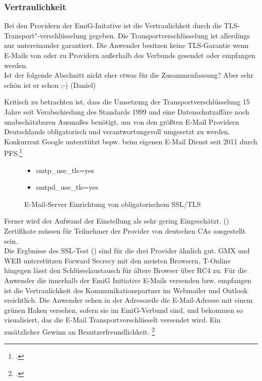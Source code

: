 \documentclass  [paper=a4,
				fontsize=12pt,
				listof=totoc,
				bibliography=totoc
				]{scrreprt}
\begin{document}
		\subsubsection{Vertraulichkeit}		
			Bei den Providern der EmiG-Initative ist die Vertraulichkeit durch die TLS-Transport"-verschlüsselung gegeben. 
			Die Transportverschlüsselung ist allerdings nur untereinander garantiert. 
			Die Anwender besitzen keine TLS-Garantie wenn E-Mails von oder zu Providern außerhalb des Verbunds gesendet oder empfangen werden.\\

			\color{darkred}
				Ist der folgende Abschnitt nicht eher etwas für die Zusammenfassung?
				Aber sehr schön ist er schon ;-) (Daniel)
			\color{black}

			Kritisch zu betrachten ist, dass die Umsetzung der Transportverschlüsselung 15 Jahre seit Verabschiedung des Standards 1999 und eine Datenschutzaffäre noch unabschätzbaren Ausmaßes benötigt, um von den größten E-Mail Providern Deutschlands obligatorisch und verantwortungsvoll umgesetzt zu werden. 
			Konkurrent Google unterstützt bspw. beim eigenen E-Mail Dienst seit 2011 durch PFS.\footcite[Vgl.][]{Boeck2013}
			
			\begin{figure} %
				\vspace{-24pt}
				\centering
				\begin{itemize}
					\renewcommand{\labelitemi}{$\Rightarrow$}
					\item smtp\_use\_tls=yes
					\item smtpd\_use\_tls=yes
				\end{itemize}
				\caption[EmiG: SSL/TLS wurde aktiviert]{E-Mail-Server Einrichtung von obligatorischem SSL/TLS\footnotemark}
				\label{fig:emig_tls} %
				\vspace{-12pt}
			\end{figure}
			Ferner wird der Aufwand der Einstellung als sehr gering Eingeschätzt. ()\\
			Zertifikate müssen für Teilnehmer der Provider von deutschen \acp{CA} ausgestellt sein.\medskip\\
			Die Ergbnisse des SSL-Test () sind für die drei Provider ähnlich gut. GMX und WEB unterstützen Forward Secrecy mit den meisten Browsern, T-Online hingegen lässt den Schlüsselaustausch für ältere Browser über RC4 zu.
			Für die Anwender die innerhalb der EmiG Initiative E-Mails versenden bzw. empfangen ist die Vertraulichkeit des Kommunikationspartner im Webmailer und Outlook ersichtlich.
			Die Anwender sehen in der Adresszeile die E-Mail-Adresse mit einem grünen Haken versehen, sofern sie im EmiG-Verbund sind, und bekommen so visualisiert, das die E-Mail Transportverschlüsselt versendet wird. Ein zusätzlicher Gewinn an Benutzerfreundlichkeit.
			\footcite[Vgl.][]{Zivadino14-1}
\end{document}
